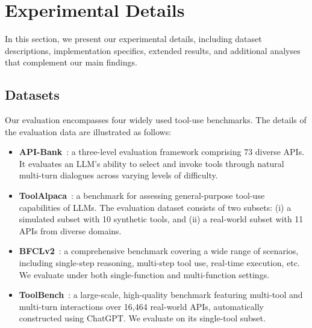 \section{Experimental Details}
\label{appendix:exp_details}
In this section, we present our experimental details, including dataset descriptions, implementation specifics, extended results, and additional analyses that complement our main findings.



\subsection{Datasets} 
\label{appendix:dataset_details}
Our evaluation encompasses four widely used tool-use benchmarks. The details of the evaluation data are illustrated as follows:
\begin{itemize}
    \item  \textbf{API-Bank}~\citep{apibank}: a three-level evaluation framework comprising 73 diverse APIs. It evaluates an LLM’s ability to select and invoke tools through natural multi-turn dialogues across varying levels of difficulty.
    \item  \textbf{ToolAlpaca}~\cite{ToolAlpaca}: a benchmark for assessing general-purpose tool-use capabilities of LLMs. The evaluation dataset consists of two subsets: (i) a simulated subset with 10 synthetic tools, and (ii) a real-world subset with 11 APIs from diverse domains.
    \item  \textbf{BFCLv2}~\cite{BFCL}: a comprehensive benchmark covering a wide range of scenarios, including single-step reasoning, multi-step tool use, real-time execution, etc. We evaluate \method under both single-function and multi-function settings.
    \item  \textbf{ToolBench}~\cite{Qin:2024toolllm}: a large-scale, high-quality benchmark featuring multi-tool and multi-turn interactions over 16,464 real-world APIs, automatically constructed using ChatGPT. We evaluate \method on its single-tool subset.
\end{itemize}

